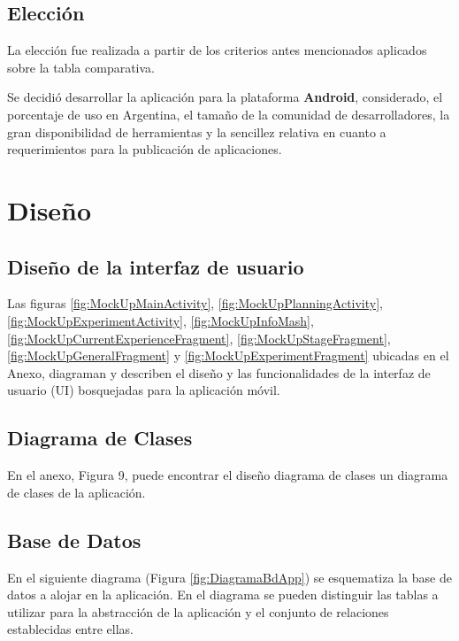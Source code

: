     
    \subsection{Elección}
    \par
    La elección fue realizada a partir de los criterios antes mencionados aplicados sobre la tabla comparativa.
    \par
    Se decidió desarrollar la aplicación para la plataforma \textbf{Android}, considerado, el porcentaje de uso en Argentina, el tamaño de la comunidad de desarrolladores, la gran disponibilidad de herramientas y la sencillez relativa en cuanto a  requerimientos para la publicación de aplicaciones.




\section{Diseño}
    \subsection{Diseño de la interfaz de usuario}
        \par Las figuras \ref{fig:MockUpMainActivity}, \ref{fig:MockUpPlanningActivity}, \ref{fig:MockUpExperimentActivity}, \ref{fig:MockUpInfoMash}, \ref{fig:MockUpCurrentExperienceFragment}, \ref{fig:MockUpStageFragment}, \ref{fig:MockUpGeneralFragment} y \ref{fig:MockUpExperimentFragment} ubicadas en el Anexo, diagraman y describen el diseño y las funcionalidades de la interfaz de usuario (UI) bosquejadas para la aplicación móvil.
        
    \subsection{Diagrama de Clases}
    \par
    En el anexo, Figura 9, puede encontrar el diseño diagrama de clases  un diagrama de clases  de la aplicación.
    
    \subsection{Base de Datos}
        \par En el siguiente diagrama (Figura \ref{fig:DiagramaBdApp}) se esquematiza la base de datos a alojar en la aplicación. En el diagrama se pueden distinguir las tablas a utilizar para la abstracción de la aplicación y el conjunto de relaciones establecidas entre ellas.
        
